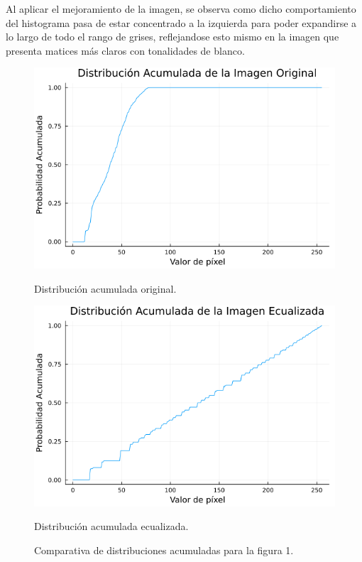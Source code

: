 \documentclass[11pt, letterpaper]{article}
\begin{document}
Al aplicar el mejoramiento de la imagen, se observa como dicho comportamiento del histograma  pasa de estar concentrado a la izquierda para poder expandirse a lo largo de todo el rango de grises, reflejandose esto mismo en la imagen que presenta matices más claros con tonalidades de blanco.

	\begin{figure}[h]
	\centering
	\begin{minipage}{0.45\textwidth}
		\centering
		\includegraphics[width=\textwidth]{RESULTADOS/img12.png}
		\caption{Distribución acumulada original.}
		\label{fig:f9}
	\end{minipage}\hfill
	\begin{minipage}{0.45\textwidth}
		\centering
		\includegraphics[width=\textwidth]{RESULTADOS/img14.png}
		\caption{Distribución acumulada ecualizada.}
		\label{fig:f10}
	\end{minipage}
	
	\caption{Comparativa de distribuciones acumuladas para la figura 1.}
	\label{fig:R2}
\end{figure}
\end{document}

